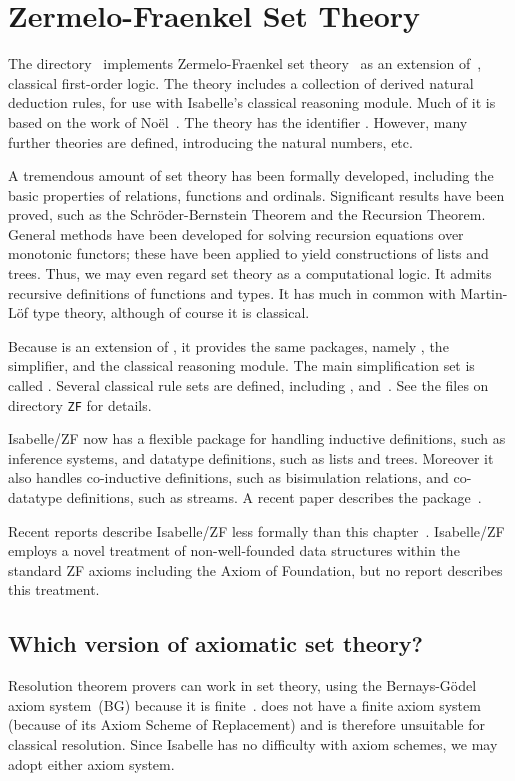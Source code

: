 \chapter{Zermelo-Fraenkel Set Theory}
The directory~ implements Zermelo-Fraenkel set
theory~\cite{halmos60,suppes72} as an extension of~, classical
first-order logic.  The theory includes a collection of derived natural
deduction rules, for use with Isabelle's classical reasoning module.  Much
of it is based on the work of No\"el~\cite{noel}.  The theory has the {\ML}
identifier .  However, many further theories
are defined, introducing the natural numbers, etc.

A tremendous amount of set theory has been formally developed, including
the basic properties of relations, functions and ordinals.  Significant
results have been proved, such as the Schr\"oder-Bernstein Theorem and the
Recursion Theorem.  General methods have been developed for solving
recursion equations over monotonic functors; these have been applied to
yield constructions of lists and trees.  Thus, we may even regard set
theory as a computational logic.  It admits recursive definitions of
functions and types.  It has much in common with Martin-L\"of type theory,
although of course it is classical.

Because {\ZF} is an extension of {\FOL}, it provides the same packages,
namely , the simplifier, and the classical reasoning
module.  The main simplification set is called .
Several classical rule sets are defined, including ,
 and~.  See the files on directory
{\tt ZF} for details.

Isabelle/ZF now has a flexible package for handling inductive definitions,
such as inference systems, and datatype definitions, such as lists and
trees.  Moreover it also handles co-inductive definitions, such as
bisimulation relations, and co-datatype definitions, such as streams.  A
recent paper describes the package~\cite{paulson-fixedpt}.  

Recent reports describe Isabelle/ZF less formally than this
chapter~\cite{paulson-set-I,paulson-set-II}.  Isabelle/ZF employs a novel
treatment of non-well-founded data structures within the standard ZF axioms
including the Axiom of Foundation, but no report describes this treatment.


\section{Which version of axiomatic set theory?}
Resolution theorem provers can work in set theory, using the
Bernays-G\"odel axiom system~(BG) because it is
finite~\cite{boyer86,quaife92}.  {\ZF} does not have a finite axiom system
(because of its Axiom Scheme of Replacement) and is therefore unsuitable
for classical resolution.  Since Isabelle has no difficulty with axiom
schemes, we may adopt either axiom system.

